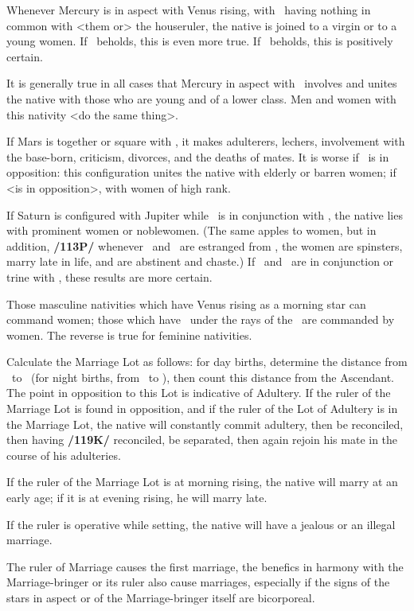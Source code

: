 Whenever Mercury is in aspect with Venus rising, with \Saturn\, having nothing in common with <them or> the houseruler, the native is joined to a virgin or to a young women. If \Mars\, beholds, this is even more true. If \Jupiter\, beholds, this is positively certain. 

It is generally true in all cases that Mercury in aspect with \Venus\, involves and unites the native with those who are young and of a lower class. Men and women with this nativity <do the same thing>. 

If Mars is together or square with \Venus, it makes
adulterers, lechers, involvement with the base-born, criticism, divorces, and the deaths of mates. It is worse if \Saturn\, is in opposition: this configuration unites the native with elderly or barren women; if \Jupiter\, <is in opposition>, with women of high rank. 

If Saturn is configured with Jupiter while \Jupiter\, is in conjunction with \Venus, the native lies with prominent women or noblewomen. (The same apples to
women, but in addition, \textbf{/113P/} whenever \Mars\, and \Mercury\, are estranged from \Venus, the women are
spinsters, marry late in life, and are abstinent and chaste.) 
If \Saturn\, and \Jupiter\, are in conjunction or trine with \Venus, these results are more certain. 

Those masculine nativities which have Venus rising as a morning star can command women; those which have \Venus\, under the rays of the \Sun\, are commanded by women. The reverse is true for feminine nativities.

Calculate the Marriage Lot as follows: for day births, determine the distance from \Jupiter\, to \Venus\, (for night births, from \Venus\, to \Jupiter), then count this distance from the Ascendant. The point in opposition to this Lot is indicative of Adultery. If the ruler of the Marriage Lot is found in opposition, and if the ruler of the Lot of Adultery is in the Marriage Lot, the native will constantly commit adultery, then be reconciled, then having \textbf{/119K/} reconciled, be separated, then again rejoin his mate in the course of his adulteries. 

If the ruler of the Marriage Lot is at morning rising, the native will marry at an early age; if it is at evening rising, he will marry late. 

If the ruler is operative while setting, the native will have a jealous or an illegal marriage. 

The ruler of Marriage causes the first marriage, the benefics in harmony with the Marriage-bringer or its ruler also cause marriages, especially if the signs of the stars in aspect or of the Marriage-bringer itself are bicorporeal.


\newpage